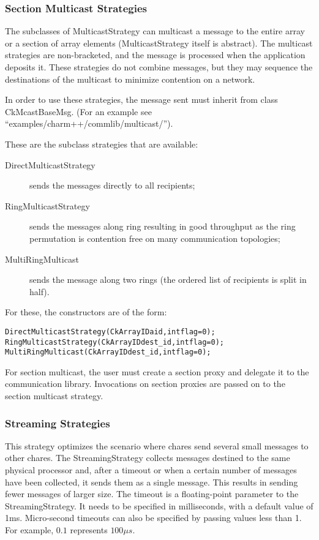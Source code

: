 {\subsubsection{Section Multicast Strategies}

The subclasses of MulticastStrategy can multicast a message to the entire array
or a section of array elements (MulticastStrategy itself is abstract). The
multicast strategies are non-bracketed, and the message is processed when the
application deposits it. These strategies do not combine messages, but they may
sequence the destinations of the multicast to minimize contention on a network.

In order to use these strategies, the message sent must inherit from class
{\textrm{CkMcastBaseMsg}}. (For an example see
``examples/charm++/commlib/multicast/'').

These are the subclass strategies that are available:

\begin{description}
\item[DirectMulticastStrategy] sends the messages directly to all recipients;
\item[RingMulticastStrategy] sends the messages along ring resulting in good throughput as the ring permutation is contention free on many communication topologies;
\item[MultiRingMulticast] sends the message along two rings (the ordered list of recipients is split in half).
\end{description}

For these, the constructors are of the form:

\begin{alltt}
DirectMulticastStrategy(CkArrayID aid, int flag=0);
RingMulticastStrategy(CkArrayID dest_id, int flag=0);
MultiRingMulticast(CkArrayID dest_id, int flag=0);
\end{alltt}

For section multicast, the user must create a section proxy and delegate it to
the communication library. Invocations on section proxies are passed on to the
section multicast strategy.


\subsubsection{Streaming Strategies}

This strategy optimizes the scenario where chares send several small messages to
other chares. The StreamingStrategy collects messages destined to the same
physical processor and, after a timeout or when a certain number of messages
have been collected, it sends them as a single message. This results in sending
fewer messages of larger size. The timeout is a floating-point parameter to the
StreamingStrategy. It needs to be specified in milliseconds, with a default
value of 1ms. Micro-second timeouts can also be specified by passing values less
than 1. For example, $0.1$ represents $100\mu s$.

}

